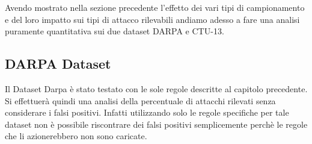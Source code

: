 \documentclass[12pt,a4paper,openright,twoside]{report}
\begin{document}
\clearpage

Avendo mostrato nella sezione precedente l'effetto dei vari tipi di campionamento
e del loro impatto sui tipi di attacco rilevabili andiamo adesso a fare una analisi
puramente quantitativa sui due dataset DARPA e CTU-13.


\subsection{DARPA Dataset}

Il Dataset Darpa \`e stato testato con le sole regole descritte al capitolo precedente.
Si effettuer\`a quindi una analisi della percentuale di attacchi rilevati senza considerare i
falsi positivi. Infatti utilizzando solo le regole specifiche per tale dataset non
\`e possibile riscontrare dei falsi positivi semplicemente perch\`e le regole che li azionerebbero
non sono caricate.
\end{document}
